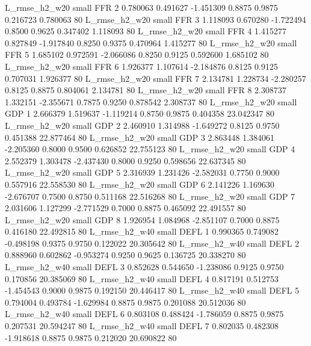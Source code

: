  L_rmse_h2_w20      small      FFR                 2 0.780063 0.491627 -1.451309 0.8875 0.9875  0.216723    0.780063 80
 L_rmse_h2_w20      small      FFR                 3 1.118093 0.670280 -1.722494 0.8500 0.9625  0.347402    1.118093 80
 L_rmse_h2_w20      small      FFR                 4 1.415277 0.827849 -1.917840 0.8250 0.9375  0.470964    1.415277 80
 L_rmse_h2_w20      small      FFR                 5 1.685102 0.972591 -2.066086 0.8250 0.9125  0.592600    1.685102 80
 L_rmse_h2_w20      small      FFR                 6 1.926377 1.107614 -2.184876 0.8125 0.9125  0.707031    1.926377 80
 L_rmse_h2_w20      small      FFR                 7 2.134781 1.228734 -2.280257 0.8125 0.8875  0.804061    2.134781 80
 L_rmse_h2_w20      small      FFR                 8 2.308737 1.332151 -2.355671 0.7875 0.9250  0.878542    2.308737 80
 L_rmse_h2_w20      small      GDP                 1 2.666379 1.519637 -1.119214 0.8750 0.9875  0.404358   23.042347 80
 L_rmse_h2_w20      small      GDP                 2 2.460910 1.314988 -1.649272 0.8125 0.9750  0.451388   22.877464 80
 L_rmse_h2_w20      small      GDP                 3 2.863448 1.384061 -2.205360 0.8000 0.9500  0.626852   22.755123 80
 L_rmse_h2_w20      small      GDP                 4 2.552379 1.303478 -2.437430 0.8000 0.9250  0.598656   22.637345 80
 L_rmse_h2_w20      small      GDP                 5 2.316939 1.231426 -2.582031 0.7750 0.9000  0.557916   22.558530 80
 L_rmse_h2_w20      small      GDP                 6 2.141226 1.169630 -2.676707 0.7500 0.8750  0.511168   22.516268 80
 L_rmse_h2_w20      small      GDP                 7 2.031606 1.127299 -2.771529 0.7000 0.8875  0.465092   22.491557 80
 L_rmse_h2_w20      small      GDP                 8 1.926954 1.084968 -2.851107 0.7000 0.8875  0.416180   22.492815 80
 L_rmse_h2_w40      small     DEFL                 1 0.990365 0.749082 -0.498198 0.9375 0.9750  0.122022   20.305642 80
 L_rmse_h2_w40      small     DEFL                 2 0.888960 0.602862 -0.953274 0.9250 0.9625  0.136725   20.338270 80
 L_rmse_h2_w40      small     DEFL                 3 0.852628 0.544650 -1.238086 0.9125 0.9750  0.170856   20.385069 80
 L_rmse_h2_w40      small     DEFL                 4 0.817191 0.512753 -1.454543 0.9000 0.9875  0.192150   20.446417 80
 L_rmse_h2_w40      small     DEFL                 5 0.794004 0.493784 -1.629984 0.8875 0.9875  0.201088   20.512036 80
 L_rmse_h2_w40      small     DEFL                 6 0.803108 0.488424 -1.786059 0.8875 0.9875  0.207531   20.594247 80
 L_rmse_h2_w40      small     DEFL                 7 0.802035 0.482308 -1.918618 0.8875 0.9875  0.212020   20.690822 80
